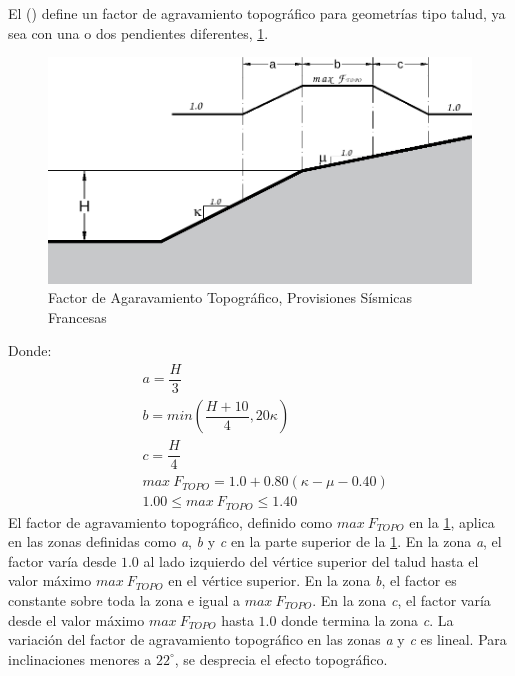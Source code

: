 \documentclass[spanish,letterpaper,12pt,twoside,openany]{article}
\begin{document}
El \citeauthor{AFPS1995} (\citeyear{AFPS1995}) define un factor de agravamiento topográfico para geometrías tipo talud, ya sea con una o dos pendientes diferentes, \cref{fig:afps}.
%
\begin{figure}[H]
	\centering
	\includegraphics[width=10 cm]{img/AFPS_French_Juan.pdf}
	\caption{Factor de Agaravamiento Topográfico, Provisiones Sísmicas Francesas}
	\label{fig:afps}
	\vspace{-1.5 cm}
\end{figure}
%
Donde:
%
\begin{align*}
	&a=\dfrac{H}{3}\\
	&b=min\left( \dfrac{H+10}{4}, 20 \kappa \right)\\
	&c=\dfrac{H}{4}\\
	&max\ F_{TOPO} = 1.0 + 0.80 \left( \kappa - \mu -0.40 \right)\\
	&1.00 \leq max\ F_{TOPO} \leq 1.40
\end{align*}
%
El factor de agravamiento topográfico, definido como $max\ F_{TOPO}$ en la \cref{fig:afps}, aplica en las zonas definidas como \textit{a}, \textit{b} y \textit{c} en la parte superior de la \cref{fig:afps}. En la zona \textit{a}, el factor varía desde $1.0$ al lado izquierdo del vértice superior del talud hasta el valor máximo $max\ F_{TOPO}$ en el vértice superior. En la zona \textit{b}, el factor es constante sobre toda la zona e igual a $max\ F_{TOPO}$. En la zona \textit{c}, el factor varía desde el valor máximo $max\ F_{TOPO}$ hasta $1.0$ donde termina la zona \textit{c}. La variación del factor de agravamiento topográfico en las zonas \textit{a} y \textit{c} es lineal. Para inclinaciones menores a $22^{\circ}$, se desprecia el efecto topográfico.
\end{document}
